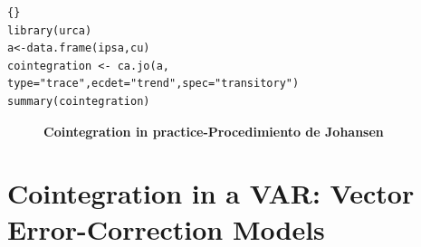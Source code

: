\begin{lstlisting}[title={‘Código R:Ejemplo Modelo IPSA - CU - S$\&$P: procedimiento de Johansen},basicstyle=\ttfamily]{}
library(urca)
a<-data.frame(ipsa,cu)
cointegration <- ca.jo(a, type="trace",ecdet="trend",spec="transitory")
summary(cointegration)
\end{lstlisting}
%
%
%
\begin{figure}[H]
	\centering
	\textbf{Cointegration in practice-Procedimiento de Johansen}\par\medskip
\end{figure}
\pagebreak\section{Cointegration in a VAR: Vector Error-Correction Models}
		
